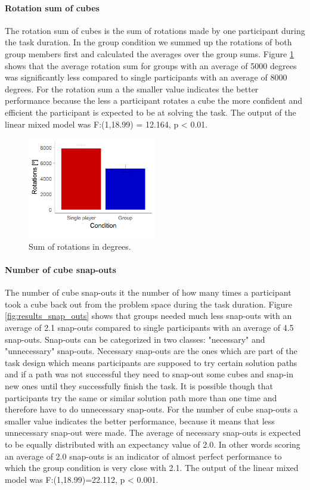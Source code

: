 \documentclass{article}
\begin{document}
\paragraph{Rotation sum of cubes}
The rotation sum of cubes is the sum of rotations made by one participant during the task duration. In the group condition we summed up the rotations of both group members first and calculated the averages over the group sums. Figure \ref{fig:results_rotations} shows that the average rotation sum for groups with an average of 5000 degrees was significantly less compared to single participants with an average of 8000 degrees. For the rotation sum a the smaller value indicates the better performance because the less a participant rotates a cube the more confident and efficient the participant is expected to be at solving the task. The output of the linear mixed model was F:(1,18.99) = 12.164, p < 0.01.

\begin{figure}[h]
\centering
\includegraphics[width=0.5\textwidth]{results_rotations}
\caption{Sum of rotations in degrees.}
\label{fig:results_rotations}
\end{figure}

\paragraph{Number of cube snap-outs}
The number of cube snap-outs it the number of how many times a participant took a cube back out from the problem space during the task duration. Figure \ref{fig:results_snap_outs} shows that groups needed much less snap-outs with an average of 2.1 snap-outs compared to single participants with an average of 4.5 snap-outs. 
Snap-outs can be categorized in two classes: "necessary" and "unnecessary" snap-outs. Necessary snap-outs are the ones which are part of the task design which means participants are supposed to try certain solution paths and if a path was not successful they need to snap-out some cubes and snap-in new ones until they successfully finish the task. It is possible though that participants try the same or similar solution path more than one time and therefore have to do unnecessary snap-outs. For the number of cube snap-outs a smaller value indicates the better performance, because it means that less unnecessary snap-out were made. The average of necessary snap-outs is expected to be equally distributed with an expectancy value of 2.0. In other words scoring an average of 2.0 snap-outs is an indicator of almost perfect performance to which the group condition is very close with 2.1.
The output of the linear mixed model was F:(1,18.99)=22.112, p < 0.001.
\end{document}
